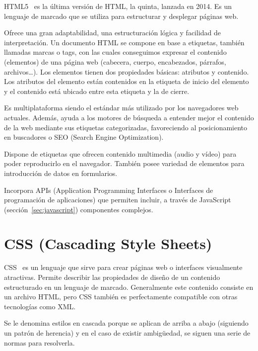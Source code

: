 \documentclass[a4paper, 12pt]{book}
\begin{document}
HTML5~\cite{html} es la última versión de HTML, la quinta, lanzada en 2014. Es un lenguaje de marcado que se utiliza para estructurar y desplegar páginas web.

\vspace{5mm}
Ofrece una gran adaptabilidad, una estructuración lógica y facilidad de interpretación.
Un documento HTML se compone en base a etiquetas, también llamadas marcas o tags, con las cuales conseguimos expresar el contenido (elementos) de una página web (cabecera, cuerpo, encabezados, párrafos, archivos…).
Los elementos tienen dos propiedades básicas: atributos y contenido.
Los atributos del elemento están contenidos en la etiqueta de inicio del elemento y el contenido está ubicado entre esta etiqueta y la de cierre.

\vspace{5mm}
Es multiplataforma siendo el estándar más utilizado por los navegadores web actuales.
Además, ayuda a los motores de búsqueda a entender mejor el contenido de la web mediante sus etiquetas categorizadas, favoreciendo al posicionamiento en buscadores o SEO (Search Engine Optimization).

\vspace{5mm}
Dispone de etiquetas que ofrecen contenido multimedia (audio y vídeo) para poder reproducirlo en el navegador.
También posee variedad de elementos para introducción de datos en formularios.

\vspace{5mm}
Incorpora APIs (Application Programming Interfaces o Interfaces de programación de aplicaciones) que permiten incluir, a través de JavaScript (sección~\ref{sec:javascript}) componentes complejos.


\section{CSS (Cascading Style Sheets)} 
\label{sec:css}

CSS~\cite{css} es un lenguaje que sirve para crear páginas web o interfaces visualmente atractivas.
Permite describir las propiedades de diseño de un contenido estructurado en un lenguaje de marcado.
Generalmente este contenido consiste en un archivo HTML, pero CSS también es perfectamente compatible con otras tecnologías como XML.

\vspace{5mm}
Se le denomina estilos en cascada porque se aplican de arriba a abajo (siguiendo un patrón de herencia) y en el caso de existir ambigüedad, se siguen una serie de normas para resolverla.
\end{document}
